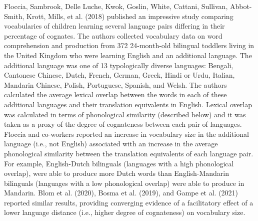 \documentclass[
  12pt,
  b5paperpaper,
  twoside]{scrreprt}
\begin{document}
Floccia, Sambrook, Delle Luche, Kwok, Goslin, White, Cattani, Sullivan,
Abbot-Smith, Krott, Mills, et al. (2018) published an impressive study
comparing vocabularies of children learning several language pairs
differing in their percentage of cognates. The authors collected
vocabulary data on word comprehension and production from 372
24-month-old bilingual toddlers living in the United Kingdom who were
learning English and an additional language. The additional language was
one of 13 typologically diverse languages: Bengali, Cantonese Chinese,
Dutch, French, German, Greek, Hindi or Urdu, Italian, Mandarin Chinese,
Polish, Portuguese, Spanish, and Welsh. The authors calculated the
average lexical overlap between the words in each of these additional
languages and their translation equivalents in English. Lexical overlap
was calculated in terms of phonological similarity (described below) and
it was taken as a proxy of the degree of cognateness between each pair
of languages. Floccia and co-workers reported an increase in vocabulary
size in the additional language (i.e., not English) associated with an
increase in the average phonological similarity between the translation
equivalents of each language pair. For example, English-Dutch bilinguals
(languages with a high phonological overlap), were able to produce more
Dutch words than English-Mandarin bilinguals (languages with a low
phonological overlap) were able to produce in Mandarin. Blom et al.
(2020), Bosma et al. (2019), and Gampe et al. (2021) reported similar
results, providing converging evidence of a facilitatory effect of a
lower language distance (i.e., higher degree of cognateness) on
vocabulary size.
\end{document}
